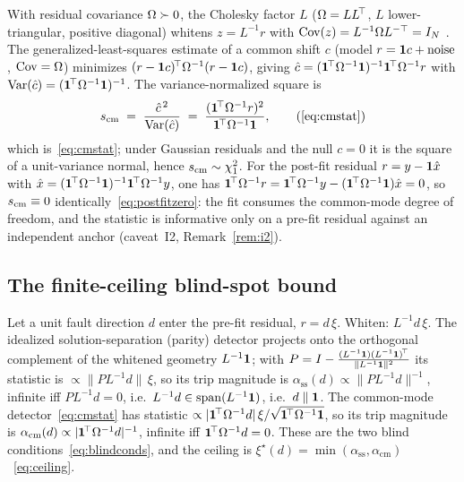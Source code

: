 With residual covariance $\Omega{}\succ0$, the Cholesky factor $L$ ($\Omega{}=LL^{\!\top}$,
$L$ lower-triangular, positive diagonal) whitens $z=L^{-1}r$ with
$\operatorname{Cov}(z)=L^{-1}\Omega{}L^{-\top}=I_N$ \citep{aitken1935}. The
generalized-least-squares estimate of a common shift $c$ (model $r=\bm 1 c+\text{noise}$,
$\operatorname{Cov}=\Omega{}$) minimizes $(r-\bm 1 c)^{\!\top}\Omega^{-1}(r-\bm 1 c)$,
giving $\hat c=(\bm 1^{\!\top}\Omega^{-1}\bm 1)^{-1}\bm 1^{\!\top}\Omega^{-1}r$ with
$\operatorname{Var}(\hat c)=(\bm 1^{\!\top}\Omega^{-1}\bm 1)^{-1}$. The
variance-normalized square is
\begin{equation}
  \scm{} \;=\; \frac{\hat c^{\,2}}{\operatorname{Var}(\hat c)}
         \;=\; \frac{(\bmone^{\!\top}\Om^{-1}r)^2}{\bmone^{\!\top}\Om^{-1}\bmone},
  \tag{\ref{eq:cmstat}}
\end{equation}
which is~\eqref{eq:cmstat}; under Gaussian residuals and the null $c=0$ it is the
square of a unit-variance normal, hence $s_{\mathrm{cm}}{}\sim\chi^2_1$. For the post-fit
residual $r=y-\bm 1\hat x$ with
$\hat x=(\bm 1^{\!\top}\Omega^{-1}\bm 1)^{-1}\bm 1^{\!\top}\Omega^{-1}y$, one has
$\bm 1^{\!\top}\Omega^{-1}r=\bm 1^{\!\top}\Omega^{-1}y-(\bm 1^{\!\top}\Omega^{-1}\bm 1)\hat
x=0$, so $s_{\mathrm{cm}}{}\equiv0$ identically~\eqref{eq:postfitzero}: the fit consumes the
common-mode degree of freedom, and the statistic is informative only on a pre-fit
residual against an independent anchor (caveat~I2, Remark~\ref{rem:i2}).

\subsection{The finite-ceiling blind-spot bound}
\label{app:blind}

Let a unit fault direction $d$ enter the pre-fit residual, $r=d\,\xi$. Whiten:
$L^{-1}d\,\xi$. The idealized solution-separation (parity) detector projects onto
the orthogonal complement of the whitened geometry $L^{-1}\bm 1{}$; with
$P=I-\tfrac{(L^{-1}\bm 1)(L^{-1}\bm 1)^{\!\top}}{\|L^{-1}\bm 1\|^2}$ its statistic
is $\propto\|P L^{-1}d\|\,\xi$, so its trip magnitude is
$\alpha_{\mathrm{ss}}(d)\propto\|P L^{-1}d\|^{-1}$, infinite iff $P L^{-1}d=0$, i.e.\
$L^{-1}d\in\operatorname{span}(L^{-1}\bm 1)$, i.e.\ $d\parallel\bm 1{}$. The
common-mode detector~\eqref{eq:cmstat} has statistic
$\propto|\bm 1^{\!\top}\Omega^{-1}d|\,\xi/\sqrt{\bm 1^{\!\top}\Omega^{-1}\bm 1}$, so its
trip magnitude is $\alpha_{\mathrm{cm}}(d)\propto|\bm 1^{\!\top}\Omega^{-1}d|^{-1}$,
infinite iff $\bm 1^{\!\top}\Omega^{-1}d=0$. These are the two blind
conditions~\eqref{eq:blindconds}, and the ceiling is
$\xi^\star(d)=\min(\alpha_{\mathrm{ss}},\alpha_{\mathrm{cm}})$~\eqref{eq:ceiling}.

